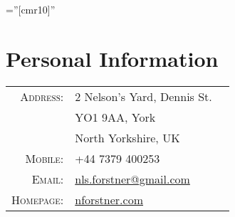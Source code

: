 \documentclass[a4paper,10pt]{article}
\begin{document}
\pagestyle{empty} %

\font\fb=''[cmr10]'' %

\par{
    \bigskip\par
}


\section{Personal Information}

\begin{tabular}{rll}
    \textsc{Address:}       & 2 Nelson's Yard, Dennis St. \\
                            & YO1 9AA, York \\
                            & North Yorkshire, UK \\
    \textsc{Mobile:}        & +44 7379 400253\\
    \textsc{Email:}         & \href{mailto:nls.forstner@gmail.com}{nls.forstner@gmail.com} \\
    \textsc{Homepage:}      & \href{https:nforstner.com}{nforstner.com} \\
\end{tabular}
\end{document}

